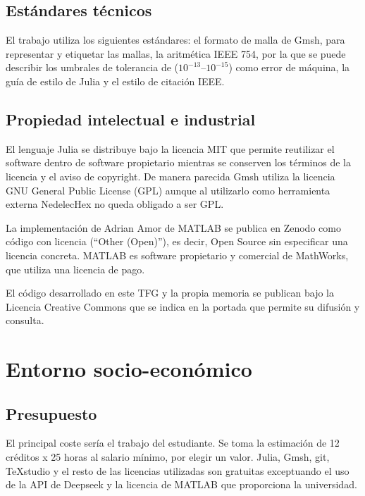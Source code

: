 \documentclass[12pt]{report} %
\begin{document}
\section{Estándares técnicos}\label{sec:estandares}
El trabajo utiliza los siguientes estándares: el formato de malla de Gmsh, \cite{geuzaine2009gmsh} para representar y etiquetar las mallas, la aritmética IEEE 754, por la que se puede describir los umbrales de tolerancia de ($10^{-13}$--$10^{-15}$) como error de máquina, la guía de estilo de Julia y el estilo de citación IEEE.

\section{Propiedad intelectual e industrial}\label{sec:propiedad}
El lenguaje Julia se distribuye bajo la licencia MIT que permite reutilizar el software dentro de software propietario mientras se conserven los términos de la licencia y el aviso de copyright. De manera parecida Gmsh \cite{geuzaine2009gmsh} utiliza  la licencia GNU General Public License (GPL) aunque al utilizarlo como herramienta externa NedelecHex no queda obligado a ser GPL.

La implementación de Adrian Amor de MATLAB \cite{amor2022zenodo} se publica en Zenodo como código con licencia (``Other (Open)''), es decir, Open Source sin especificar una licencia concreta. MATLAB es software propietario y comercial de MathWorks, que utiliza una licencia de pago.

El código desarrollado en este TFG y la propia memoria se publican bajo la Licencia Creative Commons que se indica en la portada que permite su difusión y consulta.

\chapter{Entorno socio-económico}\label{cap:entorno}

\section{Presupuesto}\label{sec:presupuesto}
El principal coste sería el trabajo del estudiante. Se toma la estimación de 12 créditos x 25 horas al salario mínimo, por elegir un valor. Julia, Gmsh, git, TeXstudio y el resto de las licencias utilizadas son gratuitas exceptuando el uso de la API de Deepseek y la licencia de MATLAB que proporciona la universidad.
\end{document}
